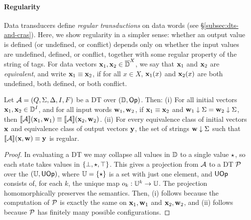 \paragraph*{Regularity}
\label{subsec:dt-regularity}
Data transducers define \emph{regular transductions} on data words (see \S\ref{subsec:dts-and-cras}). Here, we show regularity in a simpler sense: whether an output value is defined (or undefined, or conflict) depends only on whether the input values are undefined, defined, or conflict, together with some regular property of the string of tags. For data vectors $\textbf{x}_1, \textbf{x}_2 \in {\overline{\mathbb{D}{}}}^X$, we say that $\textbf{x}_1$ and $\textbf{x}_2$ are \emph{equivalent}, and write $\textbf{x}_1 \equiv \textbf{x}_2$, if for all $x \in X$, $\textbf{x}_1(x)$ and $\textbf{x}_2(x)$ are both undefined, both defined, or both conflict.

\begin{theorem}
\label{thm:regular-language}
Let $\mathcal{A} = (Q, \Sigma, \Delta, I, F)$ be a DT over $(\mathbb{D}, \textsf{Op})$. Then:
(i) For all initial vectors $\textbf{x}_1, \textbf{x}_2 \in \mathbb{D}^I$, 
and for all input words $\textbf{w}_1, \textbf{w}_2$,
if $\textbf{x}_1 \equiv \textbf{x}_2$ and $\textbf{w}_1 \downarrow \Sigma = \textbf{w}_2 \downarrow \Sigma$,
then $\llbracket \mathcal{A} \rrbracket(\textbf{x}_1,\textbf{w}_1) \equiv \llbracket \mathcal{A} \rrbracket(\textbf{x}_2,\textbf{w}_2)$.
(ii) For every equivalence class of initial vectors $\textbf{x}$ and equivalence class of output vectors $\textbf{y}$, the set of strings $\textbf{w} \downarrow \Sigma$ such that $\llbracket \mathcal{A} \rrbracket(\textbf{x},\textbf{w}) \equiv \textbf{y}$ is regular.
\end{theorem}
\begin{proof}
In evaluating a DT we may collapse all values in $\mathbb{D}$ to a single
value $\star$, so each state takes values in $\{\bot, \star, \top\}$.
This gives a projection from $\mathcal{A}$ to a DT
$\mathcal{P}$ over the  $(\mathbb{U}, \textsf{UOp})$,
where $\mathbb{U} = \{\star\}$ is a set with just one element,
and $\textsf{UOp}$ consists of, for each $k$, the unique
map $o_k : \mathbb{U}^k \to \mathbb{U}$.
The projection homomorphically preserves the semantics.
Then, (i) follows because the computation of $\mathcal{P}$ is exactly the same
on $\textbf{x}_1, \textbf{w}_1$ and $\textbf{x}_2, \textbf{w}_2$, and (ii) follows because $\mathcal{P}$ has finitely many possible configurations.
\end{proof}

